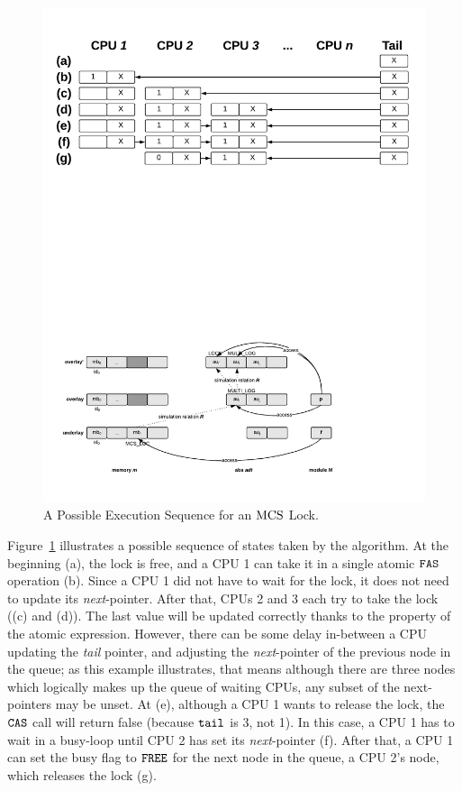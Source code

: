 \begin{figure}
\begin{center}
\includegraphics[width=0.9\linewidth]{figs/mcslock/mcsex}
\end{center}
\caption{A Possible Execution Sequence for an $\mathrm{MCS}$ Lock.}
\label{fig:chapter:mcslock:mcs-example}
\end{figure}

Figure~\ref{fig:chapter:mcslock:mcs-example} illustrates a possible sequence of states taken by the algorithm. 
At the beginning (a), the lock is free, and a CPU 1 can take it in a single atomic ${\mathrm{\texttt{FAS}}}$ operation (b).
Since a CPU 1 did not have to wait for the lock, it does not need to update its \emph{next}-pointer. 
After that, CPUs 2 and 3 each try to take the lock ((c) and (d)). 
The last value will be updated correctly thanks to the property of the atomic expression.
However, there can be some delay in-between a CPU updating the \emph{tail} pointer, and adjusting the \emph{next}-pointer of the previous node in the queue; as this example illustrates, that means although there are three nodes which logically makes up the queue of waiting CPUs, any subset of the next-pointers may be unset. 
At (e), although a CPU 1 wants to release the lock, the ${\mathrm{\texttt{CAS}}}$
call will return false (because ${\mathrm{\texttt{tail}}}$ is 3, not 1).
In this case, a CPU 1 has to wait in a busy-loop until CPU 2 has set its \emph{next}-pointer (f).
After that, a CPU 1 can set the busy flag to ${\mathrm{\texttt{FREE}}}$ for the next node in the queue, a CPU 2's node, which releases the lock (g).


